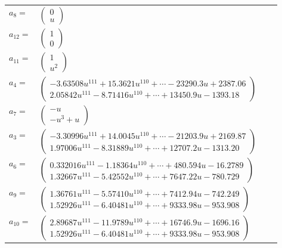 \documentclass[1p]{elsarticle_modified}
\theoremstyle{definition}
\begin{document}
\begin{tabular}{m{7pt} m{180pt} m{7pt} m{180pt} }
\flushright $a_{8}=$&$\begin{pmatrix}0\\u\end{pmatrix}$ \\
\flushright $a_{12}=$&$\begin{pmatrix}1\\0\end{pmatrix}$ \\
\flushright $a_{11}=$&$\begin{pmatrix}1\\u^2\end{pmatrix}$ \\
\flushright $a_{4}=$&$\begin{pmatrix}-3.63508 u^{111}+15.3621 u^{110}+\cdots-23290.3 u+2387.06\\2.05842 u^{111}-8.71416 u^{110}+\cdots+13450.9 u-1393.18\end{pmatrix}$ \\
\flushright $a_{7}=$&$\begin{pmatrix}- u\\- u^3+u\end{pmatrix}$ \\
\flushright $a_{3}=$&$\begin{pmatrix}-3.30996 u^{111}+14.0045 u^{110}+\cdots-21203.9 u+2169.87\\1.97006 u^{111}-8.31889 u^{110}+\cdots+12707.2 u-1313.20\end{pmatrix}$ \\
\flushright $a_{6}=$&$\begin{pmatrix}0.332016 u^{111}-1.18364 u^{110}+\cdots+480.594 u-16.2789\\1.32667 u^{111}-5.42552 u^{110}+\cdots+7647.22 u-780.729\end{pmatrix}$ \\
\flushright $a_{9}=$&$\begin{pmatrix}1.36761 u^{111}-5.57410 u^{110}+\cdots+7412.94 u-742.249\\1.52926 u^{111}-6.40481 u^{110}+\cdots+9333.98 u-953.908\end{pmatrix}$ \\
\flushright $a_{10}=$&$\begin{pmatrix}2.89687 u^{111}-11.9789 u^{110}+\cdots+16746.9 u-1696.16\\1.52926 u^{111}-6.40481 u^{110}+\cdots+9333.98 u-953.908\end{pmatrix}$ \\

\end{tabular}
\end{document}
